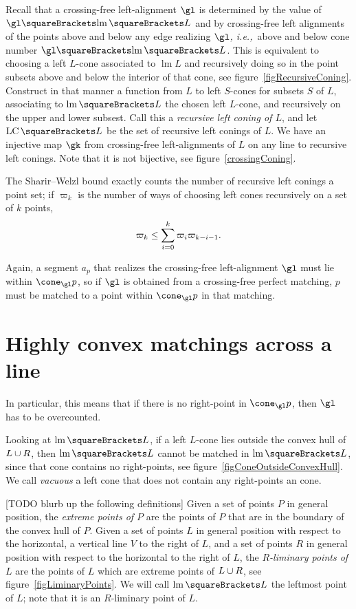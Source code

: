 \documentclass[10pt, a4paper, twoside]{basestyle}
\newcommand{\idest}{\emph{, i.e.,\ }}
\DeclareMathOperator{\leftmost}{lm}
\DeclareMathOperator{\LC}{LC}
\begin{document}
Recall that a crossing-free left-alignment $\gl$ is determined by the value of $\gl\of{\leftmost\of L}$ and by
crossing-free left alignments
of the points above and below any edge realizing $\gl$\idest above and below cone number $\gl\of{\leftmost\of L}$.
This is equivalent to choosing a left $L$-cone associated to $\leftmost L$
and recursively doing so in the point subsets above and below the
interior of that cone, see figure~\ref{figRecursiveConing}.
Construct in that manner a function from $L$ to left $S$-cones for subsets $S$ of $L$, associating
to $\leftmost\of L$ the chosen left $L$-cone, and recursively on the upper and lower subsest.
Call this a \emph{recursive left coning of $L$},
and let $\LC\of L$ be the set of recursive left conings of $L$.
We have an injective map $\gk$ from crossing-free left-alignments of $L$ on any line to recursive left conings. 
Note that it is not bijective, see figure~\ref{crossingConing}.

The Sharir--Welzl bound exactly counts the number of recursive left conings a point set;
if $\varpi_k$ is the number of ways of choosing left cones recursively on a set of $k$ points,
\[\varpi_k\leq\sum{i=0}[k]\varpi_{i}\varpi_{k-i-1}\text.\]

Again, a segment $a_p$ that realizes the crossing-free left-alignment $\gl$ must lie within $\cone_\gl p$,
so if $\gl$ is obtained from a crossing-free perfect matching, $p$ must be matched to a point within $\cone_\gl p$
in that matching.
\section{Highly convex matchings across a line}
In particular, this means that if there is no right-point in $\cone_\gl p$,
then $\gl$ has to be overcounted.

Looking at $\leftmost\of L$, if a left $L$-cone lies outside the convex hull of $L\cup R$, then
$\leftmost\of L$ cannot be matched in $\leftmost\of L$, since that cone contains no right-points, see
figure~\ref{figConeOutsideConvexHull}.
We call \emph{vacuous} a left cone that does not contain any right-points an cone.

[TODO blurb up the following definitions]
Given a set of points $P$ in general position, the \emph{extreme points of $P$} are the points of $P$ that
are in the boundary of the convex hull of $P$.
Given a set of points $L$ in general position with respect to the horizontal,
a vertical line $V$ to the right of $L$, and a set of points $R$
in general position with respect to the horizontal to the right of $L$,
the \emph{$R$-liminary points of $L$} are the points of $L$ which are extreme points of $L\cup R$,
see figure~\ref{figLiminaryPoints}.
We will call $\leftmost\of L$ the leftmost point of $L$; note that it is an $R$-liminary point of $L$.
\end{document}
